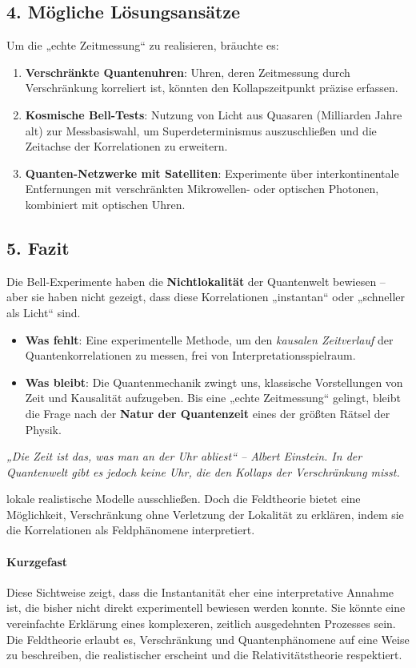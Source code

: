 \documentclass[12pt,a4paper]{article}
\begin{document}
\subsection{4. Mögliche Lösungsansätze}
Um die „echte Zeitmessung“ zu realisieren, bräuchte es:
\begin{enumerate}
    \item \textbf{Verschränkte Quantenuhren}: Uhren, deren Zeitmessung durch Verschränkung korreliert ist, könnten den Kollapszeitpunkt präzise erfassen.
    \item \textbf{Kosmische Bell-Tests}: Nutzung von Licht aus Quasaren (Milliarden Jahre alt) zur Messbasiswahl, um Superdeterminismus auszuschließen und die Zeitachse der Korrelationen zu erweitern.
    \item \textbf{Quanten-Netzwerke mit Satelliten}: Experimente über interkontinentale Entfernungen mit verschränkten Mikrowellen- oder optischen Photonen, kombiniert mit optischen Uhren.
\end{enumerate}

\subsection{5. Fazit}
Die Bell-Experimente haben die \textbf{Nichtlokalität} der Quantenwelt bewiesen – aber sie haben nicht gezeigt, dass diese Korrelationen „instantan“ oder „schneller als Licht“ sind.
\begin{itemize}
    \item \textbf{Was fehlt}: Eine experimentelle Methode, um den \textit{kausalen Zeitverlauf} der Quantenkorrelationen zu messen, frei von Interpretationsspielraum.
    \item \textbf{Was bleibt}: Die Quantenmechanik zwingt uns, klassische Vorstellungen von Zeit und Kausalität aufzugeben. Bis eine „echte Zeitmessung“ gelingt, bleibt die Frage nach der \textbf{Natur der Quantenzeit} eines der größten Rätsel der Physik.
\end{itemize}

\textit{„Die Zeit ist das, was man an der Uhr abliest“ – Albert Einstein.  
In der Quantenwelt gibt es jedoch keine Uhr, die den Kollaps der Verschränkung misst.}

lokale realistische Modelle ausschließen. Doch die Feldtheorie bietet eine Möglichkeit, Verschränkung ohne Verletzung der Lokalität zu erklären, indem sie die Korrelationen als Feldphänomene interpretiert.
	
	\paragraph{Kurzgefast}
	Diese Sichtweise zeigt, dass die Instantanität eher eine interpretative Annahme ist, die bisher nicht direkt experimentell bewiesen werden konnte. Sie könnte eine vereinfachte Erklärung eines komplexeren, zeitlich ausgedehnten Prozesses sein. Die Feldtheorie erlaubt es, Verschränkung und Quantenphänomene auf eine Weise zu beschreiben, die realistischer erscheint und die Relativitätstheorie respektiert.
	
\end{document}
